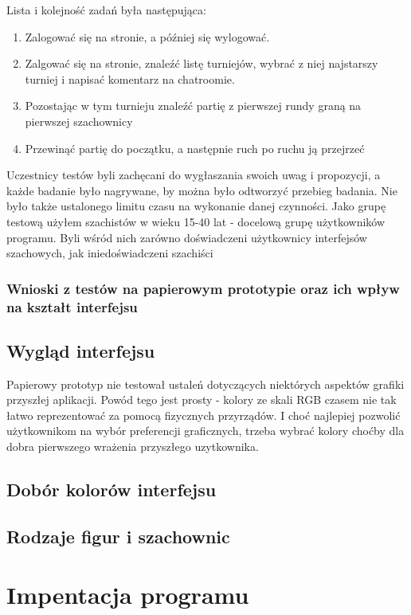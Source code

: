 \documentclass[12pt,leqno]{article}
\begin{document}
Lista i kolejność zadań była następująca:
\begin{enumerate}
\item Zalogować się na stronie, a  później się wylogować.  
\item Zalgować się na stronie, znaleźć listę turniejów, wybrać z niej najstarszy turniej i napisać komentarz na chatroomie.
\item Pozostając w tym turnieju znaleźć partię z pierwszej rundy graną na pierwszej szachownicy
\item Przewinąć partię do początku, a następnie ruch po ruchu ją przejrzeć
\end{enumerate}
Uczestnicy testów byli zachęcani do wygłaszania swoich uwag i propozycji, a każde badanie było nagrywane, by można było odtworzyć przebieg badania. Nie było także ustalonego limitu czasu na wykonanie danej czynności. Jako grupę testową użyłem szachistów w wieku 15-40 lat - docelową grupę użytkowników programu. Byli wśród nich zarówno doświadczeni użytkownicy interfejsów szachowych, jak iniedoświadczeni szachiści
\subsubsection{Wnioski z testów na papierowym prototypie oraz ich wpływ na kształt interfejsu}

\subsection{Wygląd interfejsu}
Papierowy prototyp nie testował ustaleń dotyczących niektórych aspektów grafiki przyszłej aplikacji. Powód tego jest prosty - kolory ze skali RGB czasem nie tak łatwo reprezentować za pomocą fizycznych przyrządów. I choć najlepiej pozwolić użytkownikom na wybór preferencji graficznych, trzeba wybrać kolory choćby dla dobra pierwszego wrażenia przyszłego uzytkownika.
\subsection{Dobór kolorów interfejsu}
\subsection{Rodzaje figur i szachownic}



\section{Impentacja programu}
\end{document}
